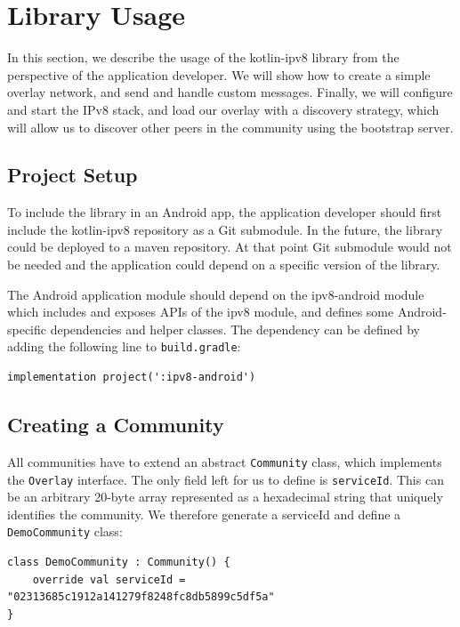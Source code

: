 \iffalse
\section{Library Usage}

In this section, we describe the usage of the kotlin-ipv8 library from the perspective of the application developer. We will show how to create a simple overlay network, and send and handle custom messages. Finally, we will configure and start the IPv8 stack, and load our overlay with a discovery strategy, which will allow us to discover other peers in the community using the bootstrap server.

\subsection{Project Setup}

To include the library in an Android app, the application developer should first include the kotlin-ipv8 repository as a Git submodule. In the future, the library could be deployed to a maven repository. At that point Git submodule would not be needed and the application could depend on a specific version of the library.

The Android application module should depend on the ipv8-android module which includes and exposes APIs of the ipv8 module, and defines some Android-specific dependencies and helper classes. The dependency can be defined by adding the following line to \texttt{build.gradle}:

\begin{verbatim}
implementation project(':ipv8-android')
\end{verbatim}

\subsection{Creating a Community}

All communities have to extend an abstract \texttt{Community} class, which implements the \texttt{Overlay} interface. The only field left for us to define is \texttt{serviceId}. This can be an arbitrary 20-byte array represented as a hexadecimal string that uniquely identifies the community. We therefore generate a serviceId and define a \texttt{DemoCommunity} class:

\begin{verbatim}
class DemoCommunity : Community() {
    override val serviceId = "02313685c1912a141279f8248fc8db5899c5df5a"
}
\end{verbatim}


